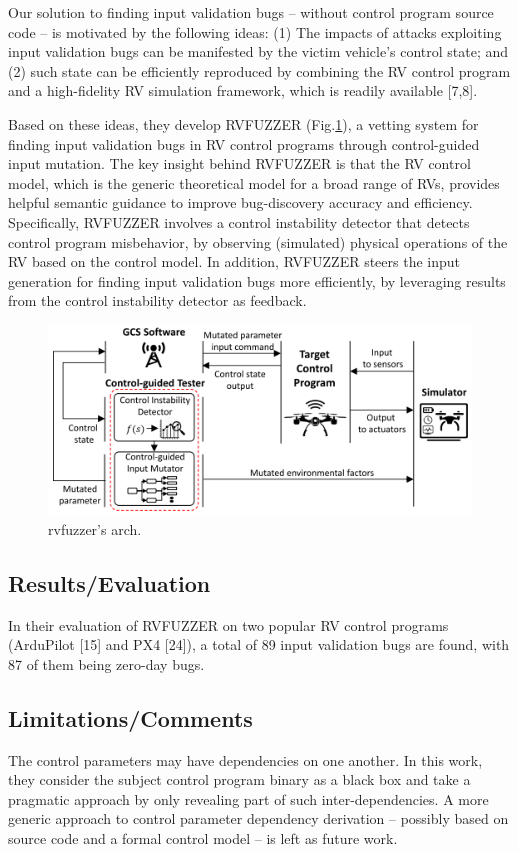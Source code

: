 Our solution to finding input validation bugs – without control program source code – is motivated by the following ideas: (1) The impacts of attacks exploiting input validation bugs can be manifested by the victim vehicle’s control state; and (2) such state can be efficiently reproduced by combining the RV control program and a high-fidelity RV simulation framework, which is readily available [7,8].

Based on these ideas, they develop RVFUZZER (Fig.\ref{fig:rvfuzzer}), a vetting system for finding input validation bugs in RV control programs through control-guided input mutation. The key insight behind RVFUZZER is that the RV control model, which is the generic theoretical model for a broad range of RVs, provides helpful semantic guidance to improve bug-discovery accuracy and efficiency. Specifically, RVFUZZER involves a control instability detector that detects control program misbehavior, by observing (simulated) physical operations of the RV based on the control model. In addition, RVFUZZER steers the input generation for finding input validation bugs more efficiently, by leveraging results from the control instability detector as feedback. 
\begin{figure}[h]
    \centering
    \includegraphics[width=0.9\linewidth]{rvfuzzer.png} %
    \caption{rvfuzzer's arch.}	
    \label{fig:rvfuzzer}
\end{figure}
\subsection{Results/Evaluation}
In their evaluation of RVFUZZER on two popular RV control programs (ArduPilot [15] and PX4 [24]), a total of 89 input validation bugs are found, with 87 of them being zero-day bugs.
\subsection{Limitations/Comments}
The control parameters may have dependencies on one another.  In this work, they consider the subject control program binary as a black box and take a pragmatic approach by only revealing part of such inter-dependencies. A more generic approach to control parameter dependency derivation – possibly based on source code and a formal control model – is left as future work.


